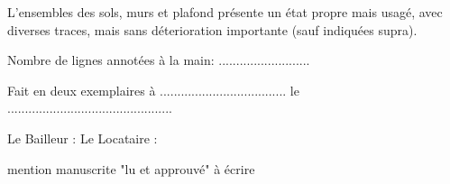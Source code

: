 \documentclass[a4paper,11pt]{article}
\begin{document}
\vspace{0.25cm}

L'ensembles des sols, murs et plafond présente un état propre mais usagé, avec diverses traces, mais sans déterioration importante (sauf indiquées supra).

\vspace{0.25cm}

Nombre de lignes annotées à la main: ..........................

\vspace{0.25cm}

Fait en deux exemplaires à .................................... le ...............................................

\vspace{0.25cm}

Le Bailleur : \hspace{3cm}Le Locataire : 

\hspace{5.2cm}mention manuscrite "lu et approuvé" à écrire


\newpage{}
\end{document}
